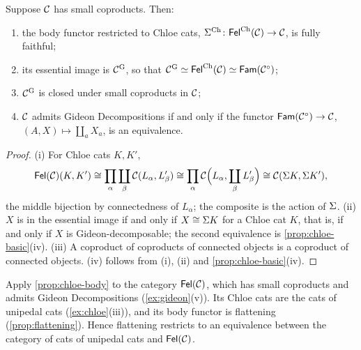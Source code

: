 \begin{proposition}\label{prop:chloe-body}
Suppose $\mathcal{C}$ has small coproducts. Then:
\begin{enumerate}
\item the body functor restricted to Chloe cats,
  $\Sigma^{\mathrm{Ch}}\colon\mathsf{Fel}^{\mathrm{Ch}}(\mathcal{C})\to\mathcal{C}$, is fully faithful;
\item its essential image is $\mathcal{C}^{\mathrm{G}}$, so that
  $\mathcal{C}^{\mathrm{G}}\simeq\mathsf{Fel}^{\mathrm{Ch}}(\mathcal{C})\simeq\mathsf{Fam}(\mathcal{C}^\circ)$;
\item $\mathcal{C}^{\mathrm{G}}$ is closed under small coproducts in $\mathcal{C}$;
\item $\mathcal{C}$ admits Gideon Decompositions if and only if the functor
  $\mathsf{Fam}(\mathcal{C}^\circ)\to\mathcal{C}$, $(A,X)\mapsto\coprod_aX_a$, is an equivalence.
\end{enumerate}
\end{proposition}

\begin{proof}
(i) For Chloe cats $K,K'$,
\[
\mathsf{Fel}(\mathcal{C})(K,K')\cong\prod_\alpha\coprod_\beta\mathcal{C}(L_\alpha,L'_\beta)\cong\prod_\alpha\mathcal{C}\Bigl(L_\alpha,\coprod_\beta L'_\beta\Bigr)\cong\mathcal{C}(\Sigma K,\Sigma K'),
\]
the middle bijection by connectedness of $L_\alpha$; the composite is the action
of $\Sigma$. (ii) $X$ is in the essential image if and only if $X\cong\Sigma K$ for a
Chloe cat $K$, that is, if and only if $X$ is Gideon-decomposable; the second
equivalence is \cref{prop:chloe-basic}(iv). (iii) A coproduct of coproducts of
connected objects is a coproduct of connected objects. (iv) follows from (i),
(ii) and \cref{prop:chloe-basic}(iv).
\end{proof}

\begin{example}\label{ex:flattening-chloe}
Apply \cref{prop:chloe-body} to the category $\mathsf{Fel}(\mathcal{C})$, which has small
coproducts and admits Gideon Decompositions (\cref{ex:gideon}(v)). Its Chloe
cats are the cats of unipedal cats (\cref{ex:chloe}(iii)), and its body functor
is flattening (\cref{prop:flattening}). Hence flattening restricts to an
equivalence between the category of cats of unipedal cats and $\mathsf{Fel}(\mathcal{C})$.
\end{example}

